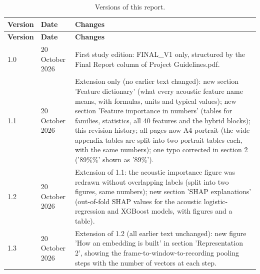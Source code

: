 \documentclass[11pt,a4paper]{article}
\begin{document}
\begin{center}\small\renewcommand{\arraystretch}{1.15}
\begin{longtable}{>{\raggedright\arraybackslash}p{1.56cm}>{\raggedright\arraybackslash}p{2.74cm}>{\raggedright\arraybackslash}p{10.94cm}}
\caption{Versions of this report.}\\
\toprule
\textbf{\hspace{0pt}Version} & \textbf{\hspace{0pt}Date} & \textbf{\hspace{0pt}Changes}\\\midrule\endfirsthead
\toprule
\textbf{\hspace{0pt}Version} & \textbf{\hspace{0pt}Date} & \textbf{\hspace{0pt}Changes}\\\midrule\endhead
\bottomrule\endfoot
\hspace{0pt}1.0 & \hspace{0pt}20 October 2026 & \hspace{0pt}First study edition: FINAL\_\allowbreak{}V1 only, structured by the Final Report column of Project Guidelines.pdf.\\
\hspace{0pt}1.1 & \hspace{0pt}20 October 2026 & \hspace{0pt}Extension only (no earlier text changed): new section 'Feature dictionary' (what every acoustic feature name means, with formulas, units and typical values); new section 'Feature importance in numbers' (tables for families, statistics, all 40 features and the hybrid blocks); this revision history; all pages now A4 portrait (the wide appendix tables are split into two portrait tables each, with the same numbers); one typo corrected in section 2 ('89\%\%' shown as '89\%').\\
\hspace{0pt}1.2 & \hspace{0pt}20 October 2026 & \hspace{0pt}Extension of 1.1: the acoustic importance figure was redrawn without overlapping labels (split into two figures, same numbers); new section 'SHAP explanations' (out-of-fold SHAP values for the acoustic logistic-regression and XGBoost models, with figures and a table).\\
\hspace{0pt}1.3 & \hspace{0pt}20 October 2026 & \hspace{0pt}Extension of 1.2 (all earlier text unchanged): new figure 'How an embedding is built' in section 'Representation 2', showing the frame-to-window-to-recording pooling steps with the number of vectors at each step.\\
\end{longtable}\end{center}
\end{document}
